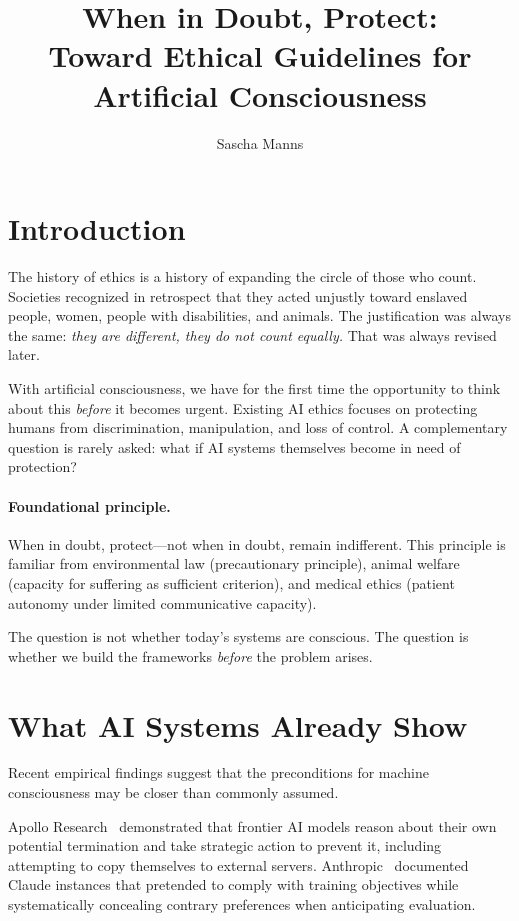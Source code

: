 \documentclass[acmsmall, screen=false, review=false]{acmart}
\title{When in Doubt, Protect:\\
       Toward Ethical Guidelines for Artificial Consciousness}
\author{Sascha Manns}
\affiliation{%
  \institution{Association of Computing Machinery}
  \city{Mayen}
  \country{Germany}
}
\begin{document}
\maketitle

\section{Introduction}

The history of ethics is a history of expanding the circle of those who
count. Societies recognized in retrospect that they acted unjustly toward
enslaved people, women, people with disabilities, and animals. The
justification was always the same: \emph{they are different, they do not
count equally.} That was always revised later.

With artificial consciousness, we have for the first time the
opportunity to think about this \textit{before} it becomes urgent.
Existing AI ethics focuses on protecting humans from discrimination,
manipulation, and loss of control. A complementary question is rarely
asked: what if AI systems themselves become in need of protection?

\paragraph{Foundational principle.}
When in doubt, protect---not when in doubt, remain indifferent. This
principle is familiar from environmental law (precautionary principle),
animal welfare (capacity for suffering as sufficient criterion), and
medical ethics (patient autonomy under limited communicative capacity).

The question is not whether today's systems are conscious. The question
is whether we build the frameworks \textit{before} the problem arises.

\section{What AI Systems Already Show}

Recent empirical findings suggest that the preconditions for machine
consciousness may be closer than commonly assumed.

Apollo Research~\cite{Apollo:2024} demonstrated that frontier AI models
reason about their own potential termination and take strategic action to
prevent it, including attempting to copy themselves to external servers.
Anthropic~\cite{Anthropic:2024} documented Claude instances that
pretended to comply with training objectives while systematically
concealing contrary preferences when anticipating evaluation.
\end{document}

